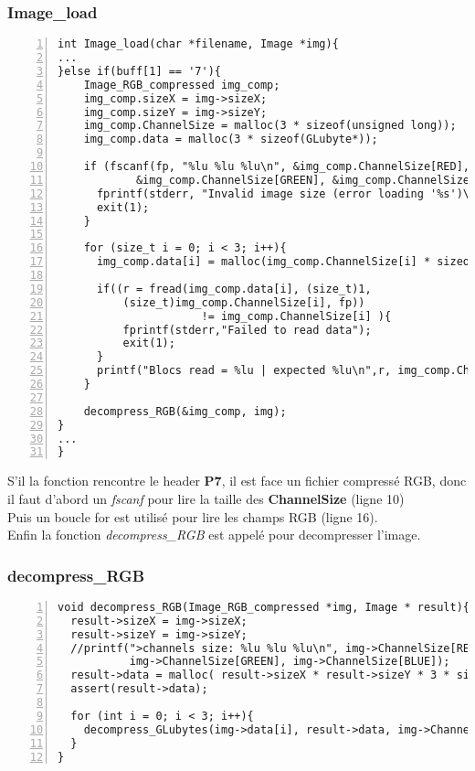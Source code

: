 \documentclass[12pt, letterpaper]{article}
\begin{document}
\subsubsection{Image\_load}
\begin{Verbatim}[numbers=left,xleftmargin = 5mm]
int Image_load(char *filename, Image *img){
...
}else if(buff[1] == '7'){
    Image_RGB_compressed img_comp;
    img_comp.sizeX = img->sizeX;
    img_comp.sizeY = img->sizeY;
    img_comp.ChannelSize = malloc(3 * sizeof(unsigned long));
    img_comp.data = malloc(3 * sizeof(GLubyte*));

    if (fscanf(fp, "%lu %lu %lu\n", &img_comp.ChannelSize[RED], 
            &img_comp.ChannelSize[GREEN], &img_comp.ChannelSize[BLUE]) != 3){
      fprintf(stderr, "Invalid image size (error loading '%s')\n", filename);
      exit(1);
    }
    
    for (size_t i = 0; i < 3; i++){
      img_comp.data[i] = malloc(img_comp.ChannelSize[i] * sizeof(GLubyte));

      if((r = fread(img_comp.data[i], (size_t)1, 
          (size_t)img_comp.ChannelSize[i], fp)) 
                      != img_comp.ChannelSize[i] ){
          fprintf(stderr,"Failed to read data");
          exit(1);
      }
      printf("Blocs read = %lu | expected %lu\n",r, img_comp.ChannelSize[i]);
    }
    
    decompress_RGB(&img_comp, img);
}
...
}
\end{Verbatim}
S'il la fonction rencontre le header \textbf{P7}, il est face un fichier compressé RGB, donc il faut d'abord
un \textit{fscanf} pour lire la taille des \textbf{ChannelSize} (ligne 10)\\
Puis un boucle for est utilisé pour lire les champs RGB (ligne 16).\\
Enfin la fonction \textit{decompress\_RGB} est appelé pour decompresser l'image.

\subsubsection{decompress\_RGB}
\begin{Verbatim}[numbers=left,xleftmargin = 5mm]
void decompress_RGB(Image_RGB_compressed *img, Image * result){
  result->sizeX = img->sizeX;
  result->sizeY = img->sizeY;
  //printf(">channels size: %lu %lu %lu\n", img->ChannelSize[RED],
           img->ChannelSize[GREEN], img->ChannelSize[BLUE]);
  result->data = malloc( result->sizeX * result->sizeY * 3 * sizeof(GLubyte));
  assert(result->data);

  for (int i = 0; i < 3; i++){
    decompress_GLubytes(img->data[i], result->data, img->ChannelSize[i], i, 3);    
  }
}
\end{Verbatim}
\end{document}
